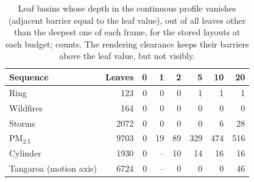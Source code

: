 \begin{table}[!htb]
\centering
\caption{Leaf basins whose depth in the continuous profile vanishes (adjacent barrier equal to the leaf value), out of all leaves other than the deepest one of each frame, for the stored layouts at each budget; counts. The rendering clearance keeps their barriers above the leaf value, but not visibly.}
\label{tab:depth}
\footnotesize
\setlength{\tabcolsep}{3pt}
\begin{tabular}{@{}lrrrrrrr@{}}
\toprule
Sequence & Leaves & 0 & 1 & 2 & 5 & 10 & 20 \\
\midrule
Ring & 123 & 0 & 0 & 0 & 1 & 1 & 1 \\
Wildfires & 164 & 0 & 0 & 0 & 0 & 0 & 0 \\
Storms & 2072 & 0 & 0 & 0 & 0 & 6 & 28 \\
PM$_{2.5}$ & 9703 & 0 & 19 & 89 & 329 & 474 & 516 \\
Cylinder & 1930 & 0 & -- & 10 & 14 & 16 & 16 \\
Tangaroa (motion axis) & 6724 & 0 & -- & 0 & 0 & 0 & 46 \\
\bottomrule
\end{tabular}
\end{table}
